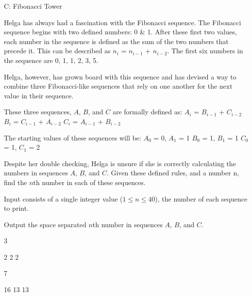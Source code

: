 \begin{problem}{C: Fibonacci Tower}

Helga has always had a fascination with the Fibonacci sequence. The Fibonacci sequence begins with two defined numbers: 0 & 1. After these first two values, each number in the sequence is defined as the sum of the two numbers that precede it. This can be described as $n_{i}$ = $n_{i-1}$ + $n_{i-2}$. The first six numbers in the sequence are 0, 1, 1, 2, 3, 5.

Helga, however, has grown board with this sequence and has devised a way to combine three Fibonacci-like sequences that rely on one another for the next value in their sequence.

These three sequences, $A$, $B$, and $C$ are formally defined as:
$A_{i}$ = $B_{i-1}$ + $C_{i-2}$
$B_{i}$ = $C_{i-1}$ + $A_{i-2}$
$C_{i}$ = $A_{i-1}$ + $B_{i-2}$

The starting values of these sequences will be:
$A_{0}$ = 0, $A_{1}$ = 1
$B_{0}$ = 1, $B_{1}$ = 1
$C_{0}$ = 1, $C_{1}$ = 2

Despite her double checking, Helga is unsure if she is correctly calculating the numbers in sequences $A$, $B$, and $C$. Given these defined rules, and a number n, find the $n$th number in each of these sequences. 
\end{problem}

\begin{formalin}
Input consists of a single integer value ($1 \leq n \leq 40$), the number of each sequence to print.
\end{formalin}

\begin{formalout}
Output the space separated $n$th number in sequences $A$, $B$, and $C$.
\end{formalout}

\begin{datain}
3
\end{datain}
\begin{dataout}
2 2 2
\end{dataout}

\begin{datain}
7
\end{datain}
\begin{dataout}
16 13 13
\end{dataout}

